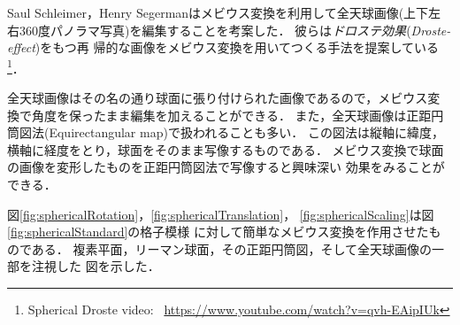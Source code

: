 Saul Schleimer，Henry Segermanはメビウス変換を利用して全天球画像(上下左
右360度パノラマ写真)を編集することを考案した\cite{bridges2016-15}．
彼らは\emph{ドロステ効果}(\textit{Droste-effect})をもつ再
帰的な画像をメビウス変換を用いてつくる手法を提案している
\footnote{Spherical Droste video:~
\url{https://www.youtube.com/watch?v=qvh-EAipIUk}}．

全天球画像はその名の通り球面に張り付けられた画像であるので，メビウス変
換で角度を保ったまま編集を加えることができる．
また，全天球画像は正距円筒図法(Equirectangular map)で扱われることも多い．
この図法は縦軸に緯度，横軸に経度をとり，球面をそのまま写像するものである．
メビウス変換で球面の画像を変形したものを正距円筒図法で写像すると興味深い
効果をみることができる．

図\ref{fig:sphericalRotation}，\ref{fig:sphericalTranslation}，
\ref{fig:sphericalScaling}は図\ref{fig:sphericalStandard}の格子模様
に対して簡単なメビウス変換を作用させたものである．
複素平面，リーマン球面，その正距円筒図，そして全天球画像の一部を注視した
図を示した．

